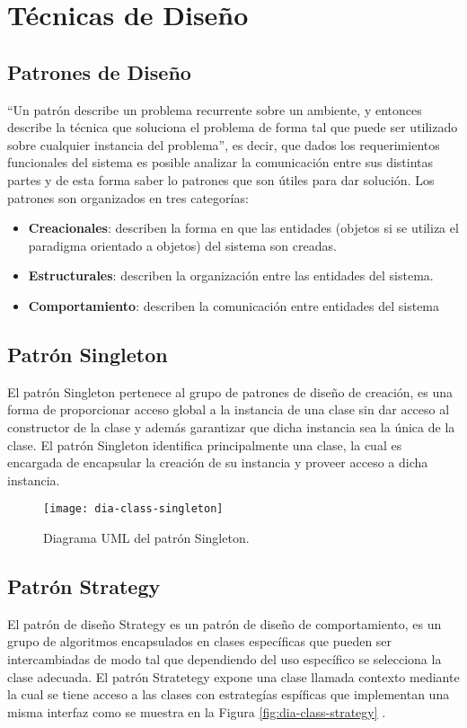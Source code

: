 \chapter{Técnicas de Diseño}\label{sec-patrones}

\section{Patrones de Diseño}
``Un patrón describe un problema recurrente sobre un ambiente, y entonces describe la técnica que soluciona el problema de forma tal que puede ser utilizado sobre cualquier instancia del problema''\cite{DesignPatterns}, es decir, que dados los requerimientos funcionales del sistema es posible analizar la comunicación entre sus distintas partes y de esta forma saber lo patrones que son útiles para dar solución. Los patrones son organizados en tres categorías\cite{DesignPatterns}:
\begin{itemize}
	\item \textbf{Creacionales}: describen la forma en que las entidades (objetos si se utiliza el paradigma orientado a objetos) del sistema son creadas.
	\item \textbf{Estructurales}: describen la organización entre las entidades del sistema.
	\item \textbf{Comportamiento}: describen la comunicación entre entidades del sistema
\end{itemize}

\section{Patrón Singleton}\label{sec-singleton}
El patrón Singleton pertenece al grupo de patrones de diseño de creación, es una forma de proporcionar acceso global a la instancia de una clase sin dar acceso al constructor de la clase y además garantizar que dicha instancia sea la única de la clase. El patrón Singleton identifica principalmente una clase, la cual es encargada de encapsular la creación de su instancia y proveer acceso a dicha instancia\cite{DesignPatternsLasater, DesignPatterns, OCPJavaSE7}.

\begin{figure}[h]
  \centering
  \texttt{[image: dia-class-singleton]}
  \caption{Diagrama UML del patrón Singleton\cite{DesignPatternsLasater}.}
  \label{fig:dia-class-singleton}
\end{figure}

\section{Patrón Strategy}\label{sec-strategy}
El patrón de diseño Strategy es un patrón de diseño de comportamiento, es un grupo de algoritmos encapsulados en clases específicas que pueden ser intercambiadas de modo tal que dependiendo del uso específico se selecciona la clase adecuada. El patrón Stratetegy expone una clase llamada contexto mediante la cual se tiene acceso a las clases con estrategías espíficas que implementan una misma interfaz como se muestra en la Figura \ref{fig:dia-class-strategy} \cite{DesignPatternsLasater, DesignPatterns}.

